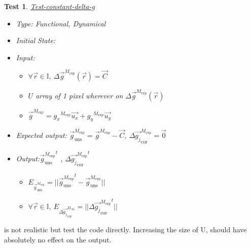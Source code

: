 \documentclass[12pt, titlepage]{article}
\newtheorem{Test}{Test}
\begin{document}
\begin{Test}\normalfont\underline{Test-constant-delta-g}
\label{T_constant-delta-g}
\begin{itemize}
\item Type: Functional, Dynamical
\item Initial State: 
\item Input: 
	\begin{itemize}
	\item $\forall \vec{r} \in \mathbb{I}, \  \Delta \overrightarrow{g}^{M_{\text{exp}}}(\vec{r})=\overrightarrow{C}$
	\item $U$ array of 1 pixel wherever on $\Delta \overrightarrow{g}^{M_{\text{exp}}}(\vec{r})$
	\item $\overrightarrow{g}^{M_{\text{exp}}}={g_x}^{M_{\text{exp}}}\overrightarrow{u_x}+{g_y}^{M_{\text{exp}}}\overrightarrow{u_y}$
	\end{itemize} 
\item Expected output: $\overrightarrow{g}_{\text{uns}}^{M_{\text{exp}}}=\overrightarrow{g}^{M_{\text{exp}}}-\overrightarrow{C}$, $\Delta\overrightarrow{g_{j}}_{\text{cor}}^{M_{\text{exp}}}=\overrightarrow{0}$
\item Output:${\overrightarrow{g}_{\text{uns}}^{M_{\text{exp}}}}^{t}$ , ${\Delta\overrightarrow{g_{j}}_{\text{cor}}^{M_{\text{exp}}}}^{t}$
	\begin{itemize}
	\item $E_{\overrightarrow{g}_{\text{uns}}^{M_{\text{exp}}}}=||{\overrightarrow{g}_{\text{uns}}^{M_{\text{exp}}}}^{t}-\overrightarrow{g}_{\text{uns}}^{M_{\text{exp}}}||$
	\item $\forall \vec{r} \in \mathbb{I}, \ E_{\Delta\overrightarrow{g_{j}}_{\text{cor}}^{M_{\text{exp}}}}=||{\Delta\overrightarrow{g_{j}}_{\text{cor}}^{M_{\text{exp}}}}^{t}||$
	\end{itemize}
\end{itemize}
\end{Test}

 is not realistic but test the code directly. Increasing the size of U, should have absolutely no effect on the output. 
\end{document}
